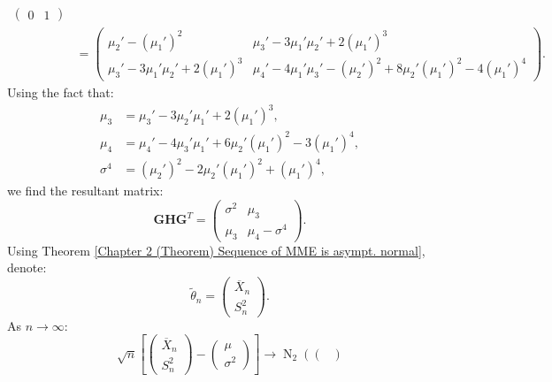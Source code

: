 \documentclass{huhtakm-template-book-v2}
\DeclareMathOperator{\N}{N}
\begin{document}
\begin{eg}
\begin{align*}
\begin{pmatrix}
                0 & 1
            \end{pmatrix}\\
            &= \begin{pmatrix}
                \mu_{2}' - (\mu_{1}')^{2} & \mu_{3}' - 3\mu_{1}'\mu_{2}' + 2(\mu_{1}')^{3}\\
                \mu_{3}' - 3\mu_{1}'\mu_{2}' + 2(\mu_{1}')^{3} & \mu_{4}' - 4\mu_{1}'\mu_{3}' - (\mu_{2}')^{2} + 8\mu_{2}'(\mu_{1}')^{2} - 4(\mu_{1}')^{4}
            \end{pmatrix}.
        \end{align*}
        Using the fact that:
        \begin{align*}
            \mu_{3} &= \mu_{3}' - 3\mu_{2}'\mu_{1}' + 2(\mu_{1}')^{3},\\ 
            \mu_{4} &= \mu_{4}' - 4\mu_{3}'\mu_{1}' + 6\mu_{2}'(\mu_{1}')^{2} - 3(\mu_{1}')^{4},\\
            \sigma^{4} &= (\mu_{2}')^{2} - 2\mu_{2}'(\mu_{1}')^{2} + (\mu_{1}')^{4},
        \end{align*}
        we find the resultant matrix:
        \begin{equation*}
            \mathbf{GHG}^{T} = \begin{pmatrix}
                \sigma^{2} & \mu_{3}\\
                \mu_{3} & \mu_{4} - \sigma^{4}
            \end{pmatrix}.
        \end{equation*}
        Using Theorem \ref{Chapter 2 (Theorem) Sequence of MME is asympt. normal}, denote:
        \begin{equation*}
            \widetilde{\theta}_{n} = \begin{pmatrix}
                \overline{X}_{n}\\ S_{n}^{2}
            \end{pmatrix}.
        \end{equation*}
        As $n \to \infty$:
        \begin{equation*}
            \sqrt{n}\left[\begin{pmatrix}
                \overline{X}_{n}\\ S_{n}^{2}
            \end{pmatrix} - \begin{pmatrix}
                \mu\\ \sigma^{2}
            \end{pmatrix}\right] \to \N_{2}\left(\begin{pmatrix}

\end{pmatrix}
\end{equation*}
\end{eg}
\end{document}
